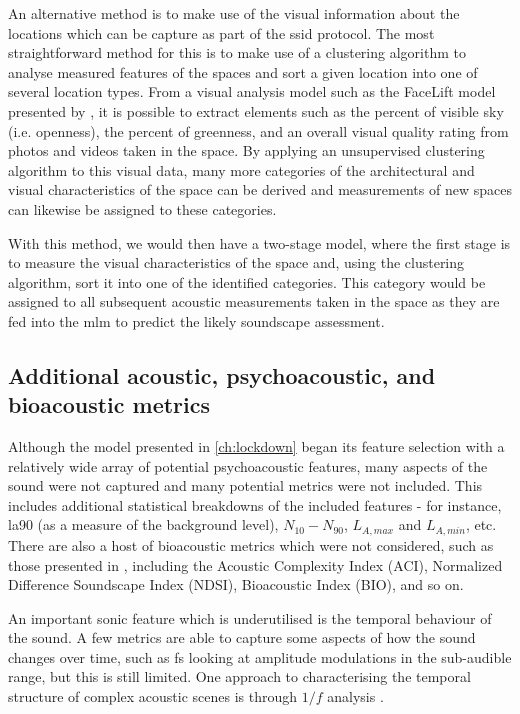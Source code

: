 An alternative method is to make use of the visual information about the locations which can be capture as part of the \gls{ssid} protocol. The most straightforward method for this is to make use of a clustering algorithm to analyse measured features of the spaces and sort a given location into one of several location types. From a visual analysis model such as the FaceLift model presented by \citet{Joglekar2020Facelift}, it is possible to extract elements such as the percent of visible sky (i.e. openness), the percent of greenness, and an overall visual quality rating from photos and videos taken in the space. By applying an unsupervised clustering algorithm to this visual data, many more categories of the architectural and visual characteristics of the space can be derived and measurements of new spaces can likewise be assigned to these categories.

With this method, we would then have a two-stage model, where the first stage is to measure the visual characteristics of the space and, using the clustering algorithm, sort it into one of the identified categories. This category would be assigned to all subsequent acoustic measurements taken in the space as they are fed into the \gls{mlm} to predict the likely soundscape assessment.

\subsection{Additional acoustic, psychoacoustic, and bioacoustic metrics}

Although the model presented in \cref{ch:lockdown} began its feature selection with a relatively wide array of potential psychoacoustic features, many aspects of the sound were not captured and many potential metrics were not included. This includes additional statistical breakdowns of the included features - for instance, \gls{la90} (as a measure of the background level), $N_{10} - N_{90}$, $L_{A,max}$ and $L_{A,min}$, etc. There are also a host of bioacoustic metrics which were not considered, such as those presented in \citet{Devos2016Soundecology}, including the Acoustic Complexity Index (ACI), Normalized Difference Soundscape Index (NDSI), Bioacoustic Index (BIO), and so on.

An important sonic feature which is underutilised is the temporal behaviour of the sound. A few metrics are able to capture some aspects of how the sound changes over time, such as \gls{fs} looking at amplitude modulations in the sub-audible range, but this is still limited. One approach to characterising the temporal structure of complex acoustic scenes is through $1/f$ analysis \citep{deCoensel20031f,deCoensel2006quiet,Yang2015Presence}.

